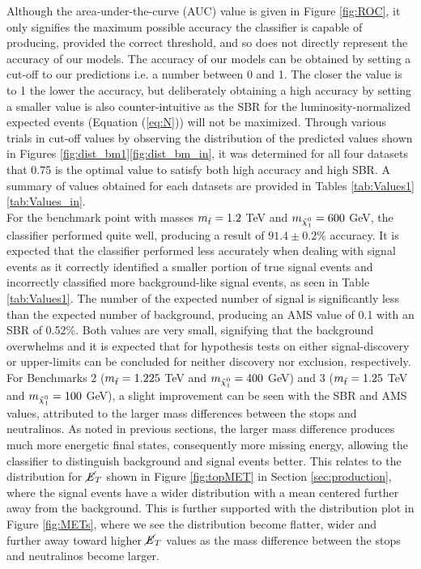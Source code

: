 Although the area-under-the-curve (AUC) value is given in Figure \ref{fig:ROC}, it only signifies the maximum possible accuracy the classifier is capable of producing, provided the correct threshold, and so does not directly represent the accuracy of our models. The accuracy of our models can be obtained by setting a cut-off to our predictions i.e. a number between 0 and 1. The closer the value is to 1 the lower the accuracy, but deliberately obtaining a high accuracy by setting a smaller value is also counter-intuitive as the SBR for the luminosity-normalized expected events (Equation (\ref{eq:N})) will not be maximized. Through various trials in cut-off values by observing the distribution of the predicted values shown in Figures \ref{fig:dist_bm1}\textemdash\ref{fig:dist_bm_in}, it was determined for all four datasets that 0.75 is the optimal value to satisfy both high accuracy and high SBR. A summary of values obtained for each datasets are provided in Tables \ref{tab:Values1}\textemdash\ref{tab:Values_in}. \\

For the benchmark point with masses $m_{\Tilde{t}} = 1.2$ TeV and $m_{\Tilde{\chi}_1^0} = 600$ GeV, the classifier performed quite well, producing a result of $91.4 \pm 0.2 \%$ accuracy. It is expected that the classifier performed less accurately when dealing with signal events as it correctly identified a smaller portion of true signal events and incorrectly classified more background-like signal events, as seen in Table \ref{tab:Values1}. The number of the expected number of signal is significantly less than the expected number of background, producing an AMS value of 0.1 with an SBR of 0.52\%. Both values are very small, signifying that the background overwhelms and it is expected that for hypothesis tests on either signal-discovery or upper-limits can be concluded for neither discovery nor exclusion, respectively. \\

For Benchmarks 2 ($m_{\Tilde{t}} = 1.225$ TeV and $m_{\Tilde{\chi}_1^0} = 400$ GeV) and 3 ($m_{\Tilde{t}} = 1.25$ TeV and $m_{\Tilde{\chi}_1^0} = 100$ GeV), a slight improvement can be seen with the SBR and AMS values, attributed to the larger mass differences between the stops and neutralinos. As noted in previous sections, the larger mass difference produces much more energetic final states, consequently more missing energy, allowing the classifier to distinguish background and signal events better. This relates to the distribution for $\cancel{\it{E}}_{T}$ shown in Figure \ref{fig:topMET} in Section \ref{sec:production}, where the signal events have a wider distribution with a mean centered further away from the background. This is further supported with the distribution plot in Figure \ref{fig:METs}, where we see the distribution become flatter, wider and further away toward higher $\cancel{\it{E}}_{T}$ values as the mass difference between the stops and neutralinos become larger. \\

